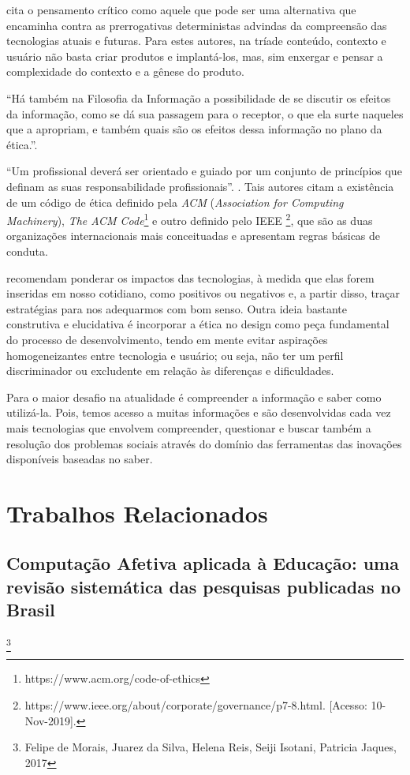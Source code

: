 \documentclass[
    12pt,                   %
    openright,              %
    oneside,                %
    a4paper,                %
    sumario=tradicional,    %
    english,                %
    brazil,                 %
    ]{abntex2}
\begin{document}
 cita o pensamento crítico como aquele que pode ser uma alternativa que encaminha contra as prerrogativas deterministas advindas da compreensão das tecnologias atuais e futuras. Para estes autores, na tríade conteúdo, contexto e usuário não basta criar produtos e implantá-los, mas, sim enxergar e pensar a complexidade do contexto e a gênese do produto.

``Há também na Filosofia da Informação a possibilidade de se discutir os efeitos da informação, como se dá sua passagem para o receptor, o que ela surte naqueles que a apropriam, e também quais são os efeitos dessa informação no plano da ética.''\cite{bembem2014tempo}.

``Um profissional deverá ser orientado e guiado por um conjunto de princípios que definam as suas responsabilidade profissionais''. \cite{piteira2019etica}. Tais autores citam a existência de um código de ética definido pela \textit{ACM} (\textit{Association for Computing Machinery}), \textit{The ACM Code}\footnote{https://www.acm.org/code-of-ethics} e outro definido pelo IEEE \footnote{https://www.ieee.org/about/corporate/governance/p7-8.html. [Acesso: 10-Nov-2019].}, que são as duas organizações internacionais mais conceituadas e apresentam regras básicas de conduta.

 recomendam ponderar os impactos das tecnologias, à medida que elas forem inseridas em nosso cotidiano, como positivos ou negativos e, a partir disso, traçar estratégias para nos adequarmos com bom senso. Outra ideia bastante construtiva e elucidativa é incorporar a ética no design como peça fundamental do processo de desenvolvimento, tendo em mente evitar aspirações homogeneizantes entre tecnologia e usuário; ou seja, não ter um perfil discriminador ou excludente em relação às diferenças e dificuldades.

Para  o	maior	desafio	na	atualidade é compreender a	informação	e	saber	como	utilizá-la.	Pois, temos acesso a muitas informações e são desenvolvidas cada vez mais tecnologias	que	envolvem compreender, questionar e buscar também	a	resolução	dos	problemas	sociais	através do	domínio	das ferramentas das	inovações disponíveis baseadas no saber.	
 
\chapter{Trabalhos Relacionados}\label{sec:TrabRel}

\section{Computação Afetiva aplicada à Educação: uma revisão sistemática das pesquisas publicadas no Brasil} \footnote{Felipe de Morais, Juarez da Silva, Helena Reis, Seiji Isotani, Patricia Jaques, 2017}
\end{document}
